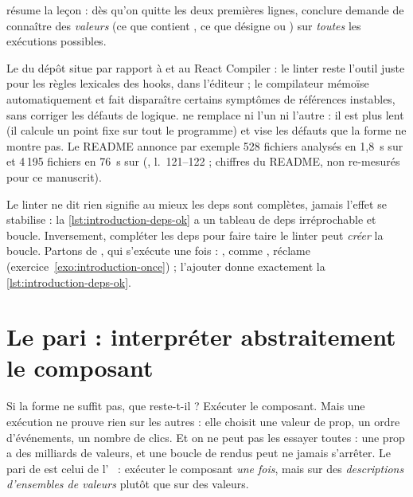  résume la leçon : dès qu'on quitte les deux
premières lignes, conclure demande de connaître des \emph{valeurs} (ce que
contient , ce que désigne  ou ) sur
\emph{toutes} les exécutions possibles.

\begin{remarque}
  Le  du dépôt situe \reactant{} par rapport à
   et au React Compiler : le linter reste
  l'outil juste pour les règles lexicales des hooks, dans l'éditeur ; le
  compilateur mémoïse automatiquement et fait disparaître certains symptômes de
  références instables, sans corriger les défauts de logique. \reactant{} ne
  remplace ni l'un ni l'autre : il est plus lent (il calcule un point fixe sur
  tout le programme) et vise les défauts que la forme ne montre pas. Le README
  annonce par exemple 528 fichiers analysés en 1,8~s sur  et
  4\,195 fichiers en 76~s sur  (, l.~121--122 ;
  chiffres du README, non re-mesurés pour ce manuscrit).
\end{remarque}

\begin{piege}
  \og Le linter ne dit rien\fg{} signifie au mieux \og les deps sont
  complètes\fg{}, jamais \og l'effet se stabilise\fg{} : la
  \cref{lst:introduction-deps-ok} a un tableau de deps irréprochable et boucle.
  Inversement, compléter les deps pour faire taire le linter peut
  \emph{créer} la boucle. Partons de , qui s'exécute une fois : , comme
  , réclame  (exercice~\ref{exo:introduction-once}) ;
  l'ajouter donne exactement la \cref{lst:introduction-deps-ok}.
\end{piege}

\section{Le pari : interpréter abstraitement le composant}
\label{sec:introduction-pari}

Si la forme ne suffit pas, que reste-t-il ? Exécuter le composant. Mais une
exécution ne prouve rien sur les autres : elle choisit une valeur de prop, un
ordre d'événements, un nombre de clics. Et on ne peut pas les essayer toutes :
une prop  a des milliards de valeurs, et une boucle de rendus peut
ne jamais s'arrêter. Le pari de \reactant{} est celui de l'~\cite{CousotCousot77} : exécuter le composant \emph{une fois}, mais
sur des \emph{descriptions d'ensembles de valeurs} plutôt que sur des valeurs.

